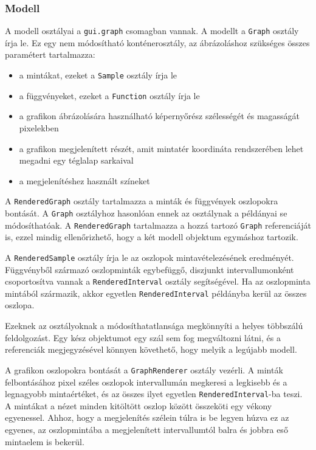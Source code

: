 \subsubsection{Modell}

A modell osztályai a \texttt{gui.graph} csomagban vannak.
A modellt a \texttt{Graph} osztály írja le.
Ez egy nem módosítható konténerosztály, az ábrázoláshoz szükséges összes paramétert tartalmazza:
\begin{itemize}
\item a mintákat, ezeket a \texttt{Sample} osztály írja le
\item a függvényeket, ezeket a \texttt{Function} osztály írja le
\item a grafikon ábrázolására használható képernyőrész szélességét és magasságát pixelekben
\item a grafikon megjelenített részét, amit mintatér koordináta rendszerében lehet megadni egy téglalap sarkaival
\item a megjelenítéshez használt színeket
\end{itemize}

A \texttt{RenderedGraph} osztály tartalmazza a minták és függvények oszlopokra bontását.
A \texttt{Graph} osztályhoz hasonlóan ennek az osztálynak a példányai se módosíthatóak.
A \texttt{RenderedGraph} tartalmazza a hozzá tartozó \texttt{Graph} referenciáját is, ezzel mindig ellenőrizhető, hogy a két modell objektum egymáshoz tartozik.

A \texttt{RenderedSample} osztály írja le az oszlopok mintavételezésének eredményét.
Függvényből származó oszlopminták egybefüggő, diszjunkt intervallumonként csoportosítva vannak a \texttt{RenderedInterval} osztály segítségével.
Ha az oszlopminta mintából származik, akkor egyetlen \texttt{RenderedInterval} példányba kerül az összes oszlopa.

Ezeknek az osztályoknak a módosíthatatlansága megkönnyíti a helyes többszálú feldolgozást.
Egy kész objektumot egy szál sem fog megváltozni látni, és a referenciák megjegyzésével könnyen követhető, hogy melyik a legújabb modell.

A grafikon oszlopokra bontását a \texttt{GraphRenderer} osztály vezérli.
A minták felbontásához pixel széles oszlopok intervallumán megkeresi a legkisebb és a legnagyobb mintaértéket, és az összes ilyet egyetlen \texttt{RenderedInterval}-ba teszi.
A mintákat a nézet minden kitöltött oszlop között összeköti egy vékony egyenessel.
Ahhoz, hogy a megjelenítés szélein túlra is be legyen húzva ez az egyenes, az oszlopmintába a megjelenített intervallumtól balra és jobbra eső mintaelem is bekerül.

